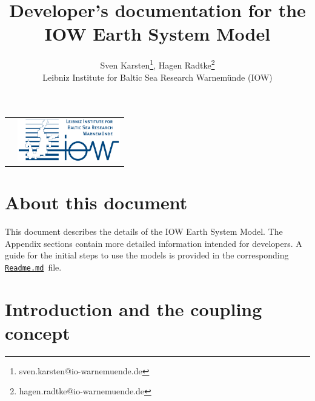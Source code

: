 \documentclass[a4paper,titlepage]{scrartcl}
\title{Developer's documentation for the IOW Earth System Model}
\author{Sven Karsten\thanks{sven.karsten@io-warnemuende.de}, Hagen Radtke\thanks{hagen.radtke@io-warnemuende.de} \\ Leibniz Institute for Baltic Sea Research Warnem\"unde (IOW)}
\begin{document}
\sffamily
\setlength{\parskip}{0.5em}
\setlength{\parindent}{0.0em}

\begin{tabular}{>{\raggedright\arraybackslash}p{} >{\raggedleft\arraybackslash}p{}}
& \href{https://www.io-warnemuende.de}{\includegraphics[height=5em]{./figures/logo_iow_englisch_rgb.jpg}} 
\end{tabular}

\vspace*{5em}
{\let\newpage\relax\maketitle}

\newcommand{\Sec}[1]{Sec.~\ref{#1}}
\newcommand{\Fig}[1]{Fig.~\ref{#1}}
\newcommand{\Readme}{\href{https://git.io-warnemuende.de/iow_esm/main}{\texttt{Readme.md}}\ }

\section*{About this document}
This document describes the details of the IOW Earth System Model. The Appendix sections contain more detailed information intended for developers. 
%
A guide for the initial steps to use the models is provided in the corresponding \Readme file.

\vfill 

\newpage

\renewcommand{\contentsname}{Table of Contents\\ \vspace{2cm}}
\tableofcontents

\newpage

\section{Introduction and the coupling concept}
\end{document}

